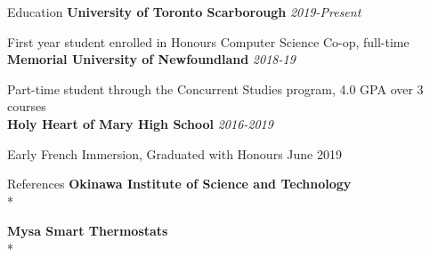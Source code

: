 \documentclass[11pt, letterpaper]{article}
\begin{document}
\begin{section}{Education}
\textbf{University of Toronto Scarborough}
\hfill
\textit{2019-Present}

First year student enrolled in Honours Computer Science Co-op, full-time\\

\textbf{Memorial University of Newfoundland}
\hfill
\textit{2018-19}

Part-time student through the Concurrent Studies program, 4.0 GPA over 3 courses\\

\textbf{Holy Heart of Mary High School}
\hfill
\textit{2016-2019}

Early French Immersion, Graduated with Honours June 2019
\end{section}

\begin{section}{References}
\textbf{Okinawa Institute of Science and Technology}\\*

\textbf{Mysa Smart Thermostats}\\*


\end{section}
\end{document}

